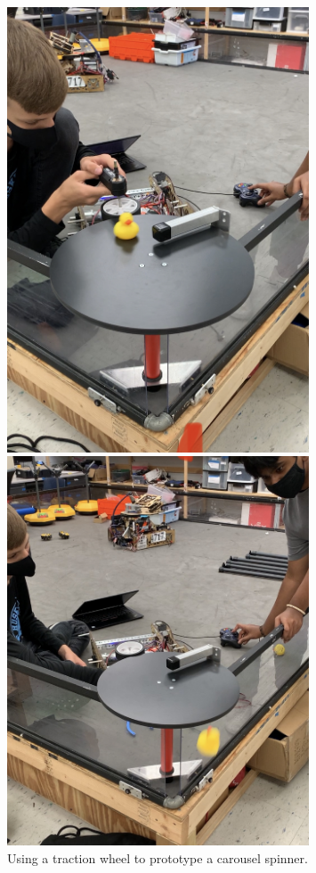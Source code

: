 \begin{figure}[ht]
\centering
\begin{minipage}[b]{.50\textwidth}
  \centering
  \includegraphics[width=0.8\textwidth]{Meetings/September/09-28-21/9-28-21_Hardware_Image1 - Nathan Forrer.jpg}
  \caption{Using a traction wheel to prototype a carousel spinner.}
  \label{fig:pic1}
\end{minipage}%
\hfill%
\begin{minipage}[b]{.50\textwidth}
  \centering
  \includegraphics[width=0.8\textwidth]{Meetings/September/09-28-21/9-28-21_Hardware_Image2 - Nathan Forrer.jpg}

\end{minipage}
\end{figure}
